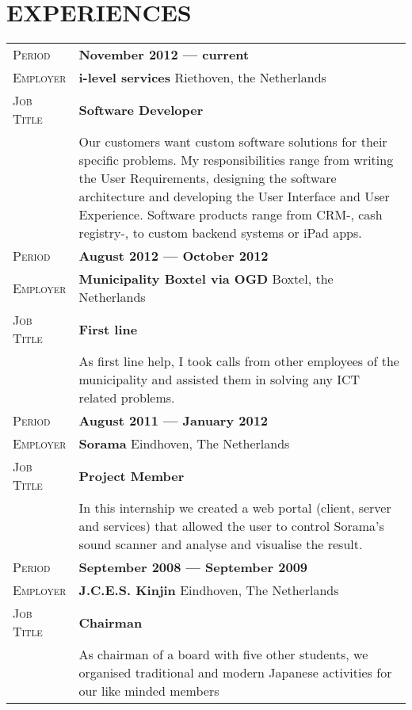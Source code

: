\documentclass[a4paper, article, 10pt]{memoir}                                  %
\newcommand{\gray}{\rowcolor[gray]{.90}}                                        %
\newcommand{\heading}[2]{                                                       %
    \section{
        {\fontsize{18}{\lineskip}\textbf{#1}}{\fontsize{12}{\lineskip}\textbf{#2}}}
        }
\begin{document}
\textsc{\color{myblue} } \vspace{2ex}             %


    \heading{E}{XPERIENCES}
        \begin{tabularx}{0.97\linewidth}{>{\raggedleft\scshape}p{2.5cm}X}
            \gray Period    & \textbf{November 2012 --- current}\\
            \gray Employer  & \textbf{i-level services} \hfill Riethoven, the Netherlands\\
            \gray Job Title & \textbf{Software Developer}\\
                            & Our customers want custom software solutions for their specific problems. My responsibilities range from writing the User Requirements, designing the software architecture and developing the User Interface and User Experience. Software products range from CRM-, cash registry-, to custom backend systems or iPad apps. \\
            \gray Period    & \textbf{August 2012 --- October 2012}\\
            \gray Employer  & \textbf{Municipality Boxtel via OGD}  \hfill Boxtel, the Netherlands\\
            \gray Job Title & \textbf{First line}\\
                            & As first line help, I took calls from other employees of the municipality and assisted them in solving any ICT related problems. \\
            \gray Period    & \textbf{August 2011 --- January 2012}\\
            \gray Employer  & \textbf{Sorama} \hfill Eindhoven, The Netherlands\\
            \gray Job Title & \textbf{Project Member}\\ %
                            & In this internship we created a web portal (client, server and services) that allowed the user to control Sorama's sound scanner and analyse and visualise the result.\\
            \gray Period    & \textbf{September 2008 --- September 2009}\\
            \gray Employer  & \textbf{J.C.E.S. Kinjin} \hfill Eindhoven, The Netherlands\\
            \gray Job Title & \textbf{Chairman}\\
                            & As chairman of a board with five other students, we organised traditional and modern Japanese activities for our like minded members\\

\end{tabularx}
\end{document}
